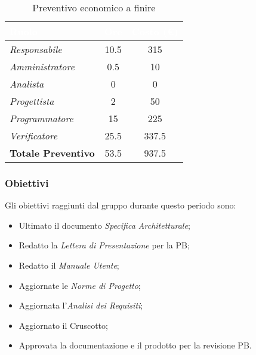 \begin{table}[H]
    \renewcommand\arraystretch{1.5}
    \centering
    \begin{tabular}{|l|c|c|}
    \hline
    \rowcolor[HTML]{036400}
    \textcolor{white}{\textbf{Ruolo}} & \multicolumn{1}{l|}{\textcolor{white}{\textbf{Ore}}} & \multicolumn{1}{l|}{\textcolor{white}{\textbf{Costo (€)}}} \\ \hline
    \rowcolor[HTML]{EFEFEF}\textit{Responsabile}      & 10.5         & 315               \\ \hline
    \rowcolor[HTML]{C0C0C0}\textit{Amministratore}    & 0.5          & 10                \\ \hline
    \rowcolor[HTML]{EFEFEF}\textit{Analista}          & 0            & 0                 \\ \hline
    \rowcolor[HTML]{C0C0C0}\textit{Progettista}       & 2            & 50                \\ \hline
    \rowcolor[HTML]{EFEFEF}\textit{Programmatore}     & 15           & 225               \\ \hline
    \rowcolor[HTML]{C0C0C0}\textit{Verificatore}      & 25.5         & 337.5             \\ \hline
    \rowcolor[HTML]{EFEFEF}\textbf{Totale Preventivo} & 53.5         & 937.5            \\ \hline
    \end{tabular}
    \caption{Preventivo economico a finire}
\end{table}

\subsubsection{Obiettivi}
Gli obiettivi raggiunti dal gruppo durante questo periodo sono:
\begin{itemize}
    \item Ultimato il documento \textit{Specifica Architetturale};
    \item Redatto la \textit{Lettera di Presentazione} per la PB;
    \item Redatto il \textit{Manuale Utente};
    \item Aggiornate le \textit{Norme di Progetto};
    \item Aggiornata l'\textit{Analisi dei Requisiti};
    \item Aggiornato il Cruscotto;
    \item Approvata la documentazione e il prodotto per la revisione PB.
\end{itemize}

